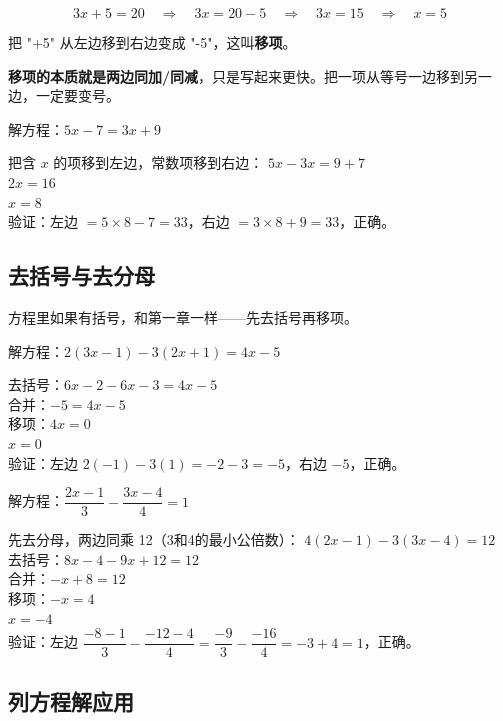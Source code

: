 \[
3x+5=20 \quad\Longrightarrow\quad 3x=20-5 \quad\Longrightarrow\quad 3x=15 \quad\Longrightarrow\quad x=5
\]

把 "+5" 从左边移到右边变成 "-5"，这叫\textbf{移项}。

\textbf{移项的本质就是两边同加/同减}，只是写起来更快。把一项从等号一边移到另一边，一定要变号。

\begin{example}
解方程：$5x-7=3x+9$
\end{example}
\begin{solution}
把含 $x$ 的项移到左边，常数项移到右边：
$5x-3x=9+7$\\
$2x=16$\\
$x=8$\\
验证：左边 $=5\times8-7=33$，右边 $=3\times8+9=33$，正确。
\end{solution}

\subsection*{去括号与去分母}

方程里如果有括号，和第一章一样——先去括号再移项。

\begin{example}
解方程：$2(3x-1)-3(2x+1)=4x-5$
\end{example}
\begin{solution}
去括号：$6x-2-6x-3=4x-5$\\
合并：$-5=4x-5$\\
移项：$4x=0$\\
$x=0$\\
验证：左边 $2(-1)-3(1)=-2-3=-5$，右边 $-5$，正确。
\end{solution}

\begin{example}
解方程：$\dfrac{2x-1}{3}-\dfrac{3x-4}{4}=1$
\end{example}
\begin{solution}
先去分母，两边同乘 12（3和4的最小公倍数）：
$4(2x-1)-3(3x-4)=12$\\
去括号：$8x-4-9x+12=12$\\
合并：$-x+8=12$\\
移项：$-x=4$\\
$x=-4$\\
验证：左边 $\dfrac{-8-1}{3}-\dfrac{-12-4}{4}=\dfrac{-9}{3}-\dfrac{-16}{4}=-3+4=1$，正确。
\end{solution}

\subsection*{列方程解应用}

